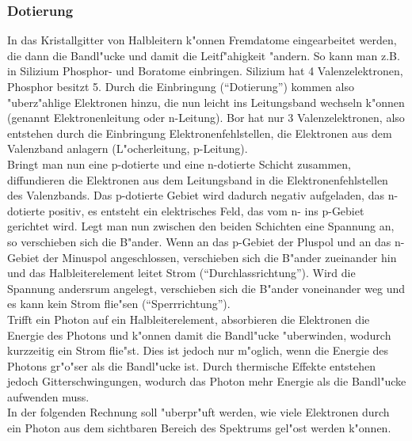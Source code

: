 \subsubsection{Dotierung}
In das Kristallgitter von Halbleitern k"onnen Fremdatome eingearbeitet werden, die dann die Bandl"ucke und damit die Leitf"ahigkeit "andern. So kann man z.B. in Silizium Phosphor- und Boratome einbringen. Silizium hat 4 Valenzelektronen, Phosphor besitzt 5. Durch die Einbringung (\enquote{Dotierung}) kommen also "uberz"ahlige Elektronen hinzu, die nun leicht ins Leitungsband wechseln k"onnen (genannt Elektronenleitung oder n-Leitung). Bor hat nur 3 Valenzelektronen, also entstehen durch die Einbringung Elektronenfehlstellen, die Elektronen aus dem Valenzband anlagern (L"ocherleitung, p-Leitung).\\
Bringt man nun eine p-dotierte und eine n-dotierte Schicht zusammen, diffundieren die Elektronen aus dem Leitungsband in die Elektronenfehlstellen des Valenzbands. Das p-dotierte Gebiet wird dadurch negativ aufgeladen, das n-dotierte positiv, es entsteht ein elektrisches Feld, das vom n- ins p-Gebiet gerichtet wird. Legt man nun zwischen den beiden Schichten eine Spannung an, so verschieben sich die B"ander.
Wenn an das p-Gebiet der Pluspol und an das n-Gebiet der Minuspol angeschlossen, verschieben sich die B"ander zueinander hin und das Halbleiterelement leitet Strom (\enquote{Durchlassrichtung}). Wird die Spannung andersrum angelegt, verschieben sich die B"ander voneinander weg und es kann kein Strom flie"sen (\enquote{Sperrrichtung}).\\
Trifft ein Photon auf ein Halbleiterelement, absorbieren die Elektronen die Energie des Photons und k"onnen damit die Bandl"ucke "uberwinden, wodurch kurzzeitig ein Strom flie"st. Dies ist jedoch nur m"oglich, wenn die Energie des Photons gr"o"ser als die Bandl"ucke ist. Durch thermische Effekte entstehen jedoch Gitterschwingungen, wodurch das Photon mehr Energie als die Bandl"ucke aufwenden muss.\\
In der folgenden Rechnung soll "uberpr"uft werden, wie viele Elektronen durch ein Photon aus dem sichtbaren Bereich des Spektrums gel"ost werden k"onnen.


